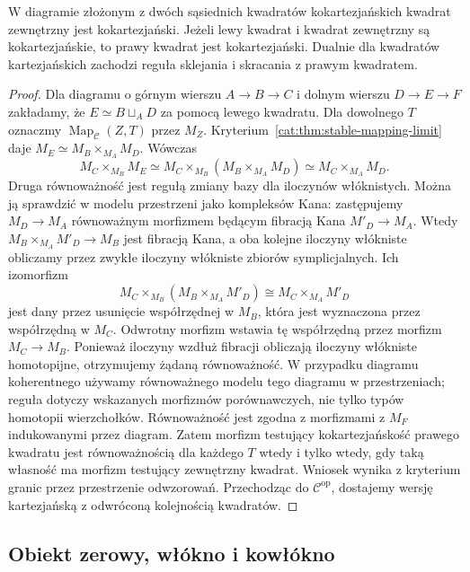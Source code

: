 \begin{lemat}\label{cat:lem:stable-square-pasting}
W diagramie złożonym z dwóch sąsiednich kwadratów kokartezjańskich kwadrat zewnętrzny jest kokartezjański. Jeżeli lewy kwadrat i kwadrat zewnętrzny są kokartezjańskie, to prawy kwadrat jest kokartezjański. Dualnie dla kwadratów kartezjańskich zachodzi reguła sklejania i skracania z prawym kwadratem.
\end{lemat}
\begin{proof}
Dla diagramu o górnym wierszu $A\to B\to C$ i dolnym wierszu $D\to E\to F$ zakładamy, że $E\simeq B\sqcup_A D$ za pomocą lewego kwadratu. Dla dowolnego $T$ oznaczmy $\operatorname{Map}_{\mathcal C}(Z,T)$ przez $M_Z$. Kryterium~\ref{cat:thm:stable-mapping-limit} daje $M_E\simeq M_B\times_{M_A}M_D$. Wówczas
\[
 M_C\times_{M_B}M_E
 \simeq M_C\times_{M_B}(M_B\times_{M_A}M_D)
 \simeq M_C\times_{M_A}M_D.
\]
Druga równoważność jest regułą zmiany bazy dla iloczynów włóknistych. Można ją sprawdzić w modelu przestrzeni jako kompleksów Kana: zastępujemy $M_D\to M_A$ równoważnym morfizmem będącym fibracją Kana $M'_D\to M_A$. Wtedy $M_B\times_{M_A}M'_D\to M_B$ jest fibracją Kana, a oba kolejne iloczyny włókniste obliczamy przez zwykłe iloczyny włókniste zbiorów symplicjalnych. Ich izomorfizm
\[
 M_C\times_{M_B}(M_B\times_{M_A}M'_D)
 \cong M_C\times_{M_A}M'_D
\]
jest dany przez usunięcie współrzędnej w $M_B$, która jest wyznaczona przez współrzędną w $M_C$. Odwrotny morfizm wstawia tę współrzędną przez morfizm $M_C\to M_B$. Ponieważ iloczyny wzdłuż fibracji obliczają iloczyny włókniste homotopijne, otrzymujemy żądaną równoważność. W przypadku diagramu koherentnego używamy równoważnego modelu tego diagramu w przestrzeniach; reguła dotyczy wskazanych morfizmów porównawczych, nie tylko typów homotopii wierzchołków. Równoważność jest zgodna z morfizmami z $M_F$ indukowanymi przez diagram. Zatem morfizm testujący kokartezjańskość prawego kwadratu jest równoważnością dla każdego $T$ wtedy i tylko wtedy, gdy taką własność ma morfizm testujący zewnętrzny kwadrat. Wniosek wynika z kryterium granic przez przestrzenie odwzorowań. Przechodząc do $\mathcal C^{\mathrm{op}}$, dostajemy wersję kartezjańską z odwróconą kolejnością kwadratów.
\end{proof}

\subsection{Obiekt zerowy, włókno i kowłókno}

